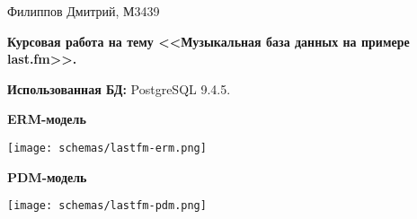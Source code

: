 \documentclass[11pt,a4paper,oneside]{article}
\begin{document}
\renewcommand{\t}[1]{\mbox{\texttt{#1}}}
\newcommand{\s}[1]{\mbox{``\t{#1}''}}
\newcommand{\eps}{\varepsilon}
\renewcommand{\phi}{\varphi}
\newcommand{\plainhat}{{\char 94}}

\newcommand{\Z}{\mathbb{Z}}
\newcommand{\w}[1]{``\t{#1}''}




Филиппов Дмитрий, М3439
\newline

\begin{LARGE} \textbf{Курсовая работа на тему <<Музыкальная база данных на примере last.fm>>.} \end{LARGE}
\newline

\textbf{Использованная БД:} PostgreSQL 9.4.5.
\newline
\newline

\begin{LARGE} \textbf{ERM-модель} \end{LARGE}
\newline

\texttt{[image: schemas/lastfm-erm.png]}
\clearpage

\begin{LARGE} \textbf{PDM-модель} \end{LARGE}
\newline

\texttt{[image: schemas/lastfm-pdm.png]}
\end{document}
